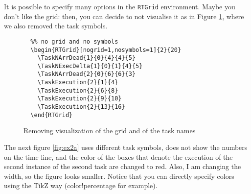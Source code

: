 \documentclass{article}
\begin{document}
It is possible to specify many options in the \texttt{RTGrid}
environment. Maybe you don't like the grid: then, you can decide to
not visualise it as in Figure \ref{fig:ex2}, where we also removed the
task symbols.
\begin{figure}[!htbp]
  \centering
  \begin{RTGrid}[nogrid=1,nosymbols=1]{2}{20}
  \end{RTGrid}
\begin{verbatim}
  %% no grid and no symbols
  \begin{RTGrid}[nogrid=1,nosymbols=1]{2}{20}
    \TaskNArrDead{1}{0}{4}{4}{5}    
    \TaskNExecDelta{1}{0}{1}{4}{5}  
    \TaskNArrDead{2}{0}{6}{6}{3}
    \TaskExecution{2}{1}{4}
    \TaskExecution{2}{6}{8}
    \TaskExecution{2}{9}{10}
    \TaskExecution{2}{13}{16}        
  \end{RTGrid}
\end{verbatim}
  \caption{Removing visualization of the grid and of the task names}
  \label{fig:ex2}
\end{figure}

The next figure \ref{fig:ex2a} uses different task symbols, does not
show the numbers on the time line, and the color of the boxes that
denote the execution of the second instance of the second task are
changed to red. Also, I am changing the width, so the figure looks
smaller. Notice that you can directly specify colors using the TikZ
 way (color!percentage for example).
\end{document}

